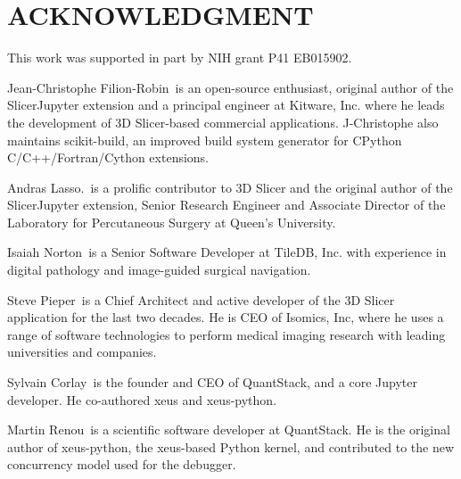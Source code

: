 \documentclass{IEEEcsmag}
\begin{document}
\section{ACKNOWLEDGMENT}

This work was supported in part by NIH grant P41 EB015902.




%

\begin{IEEEbiography}{Jean-Christophe Filion-Robin}{\,} is an open-source enthusiast, original author of the SlicerJupyter extension and a principal engineer at Kitware, Inc. where he leads the development of 3D Slicer-based commercial applications. J-Christophe also maintains scikit-build, an improved build system generator for CPython C/C++/Fortran/Cython extensions.
\end{IEEEbiography}

\begin{IEEEbiography}{Andras Lasso.}{\,} is a prolific contributor to 3D Slicer and the original author of the SlicerJupyter extension, Senior Research Engineer and Associate Director of the Laboratory for Percutaneous Surgery at Queen’s University.
\end{IEEEbiography}

\begin{IEEEbiography}{Isaiah Norton}{\,} is a Senior Software Developer at TileDB, Inc. with experience in digital pathology and image-guided surgical navigation.
\end{IEEEbiography}

\begin{IEEEbiography}{Steve Pieper}{\,} is a Chief Architect and active developer of the 3D Slicer application for the last two  decades. He is CEO of Isomics, Inc, where he uses a range of software technologies to perform medical imaging research with leading universities and companies.
\end{IEEEbiography}

\begin{IEEEbiography}{Sylvain Corlay}{\,} is the founder and CEO of QuantStack, and a core Jupyter developer. He co-authored xeus and xeus-python.
\end{IEEEbiography}

\begin{IEEEbiography}{Martin Renou}{\,} is a scientific software developer at QuantStack. He is the original author of xeus-python, the xeus-based Python kernel, and contributed to the new concurrency model used for the debugger.
\end{IEEEbiography}
\end{document}
